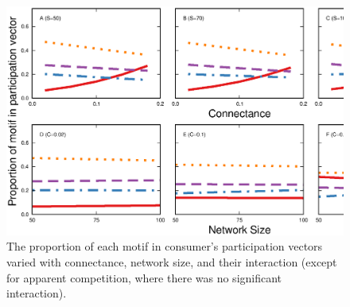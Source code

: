 \documentclass[12pt]{article}
\begin{document}
\begin{spacing}{2.0}
    \begin{figure}[ht!]
        \centering
        \includegraphics[width=\textwidth]{figures/roles_vs_SC_all.eps}
        \caption{The proportion of each motif in consumer's participation vectors varied with connectance, network size, and their interaction (except for apparent competition, where there was no significant interaction).}
        \label{fig:motifs_vs_TL_and_deg}
    \end{figure}    


\end{spacing}
\end{document}
